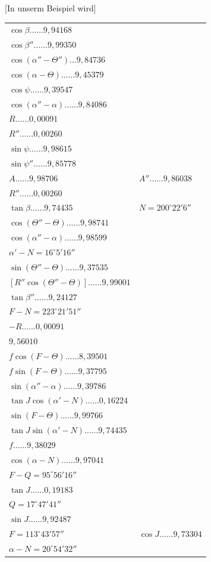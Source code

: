 \documentclass[12pt,a4paper]{article}
\begin{document}
[In unserm Beispiel wird]
\begin{center}
\begin{tabular}{ll}
$\cos\beta \ldots\ldots 9{,}94168$ & \\
$\cos\beta'' \ldots\ldots 9{,}99350$ & \\
$\cos(\alpha'' - \Theta'') \ldots 9{,}84736$ & \\
$\cos(\alpha - \Theta) \ldots\ldots 9{,}45379$ & \\
$\cos\psi \ldots\ldots 9{,}39547$ & \\
$\cos(\alpha'' - \alpha) \ldots\ldots 9{,}84086$ & \\
$R \ldots\ldots 0{,}00091$ & \\
$R'' \ldots\ldots 0{,}00260$ & \\
$\sin\psi \ldots\ldots 9{,}98615$ & \\
$\sin\psi'' \ldots\ldots 9{,}85778$ & \\
$A \ldots\ldots 9{,}98706$ & $A'' \ldots\ldots 9{,}86038$ \\
$R'' \ldots\ldots 0{,}00260$ & \\
$\tan\beta \ldots\ldots 9{,}74435$ & $N = 200^\circ 22' 6''$ \\
$\cos(\Theta'' - \Theta) \ldots\ldots 9{,}98741$ & \\
$\cos(\alpha'' - \alpha) \ldots\ldots 9{,}98599$ & \\
$\alpha' - N = 16^\circ 5' 16''$ & \\
$\sin(\Theta'' - \Theta) \ldots\ldots 9{,}37535$ & \\
$[R''\cos(\Theta'' - \Theta)] \ldots\ldots 9{,}99001$ & \\
$\tan\beta'' \ldots\ldots 9{,}24127$ & \\
$F - N = 223^\circ 21' 51''$ & \\
$-R \ldots\ldots 0{,}00091$ & \\
$9{,}56010$ & \\
$f\cos(F - \Theta) \ldots\ldots 8{,}39501$ & \\
$f\sin(F - \Theta) \ldots\ldots 9{,}37795$ & \\
$\sin(\alpha'' - \alpha) \ldots\ldots 9{,}39786$ & \\
$\tan J \cos(\alpha' - N) \ldots\ldots 0{,}16224$ & \\
$\sin(F - \Theta) \ldots\ldots 9{,}99766$ & \\
$\tan J \sin(\alpha' - N) \ldots\ldots 9{,}74435$ & \\
$f \ldots\ldots 9{,}38029$ & \\
$\cos(\alpha - N) \ldots\ldots 9{,}97041$ & \\
$F - Q = 95^\circ 56' 16''$ & \\
$\tan J \ldots\ldots 0{,}19183$ & \\
$Q = 17^\circ 47' 41''$ & \\
$\sin J \ldots\ldots 9{,}92487$ & \\
$F = 113^\circ 43' 57''$ & $\cos J \ldots\ldots 9{,}73304$ \\
$\alpha - N = 20^\circ 54' 32''$ & \\
\end{tabular}
\end{center}
\end{document}
